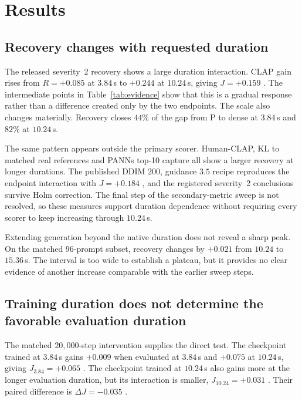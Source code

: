 \section{Results}
\subsection{Recovery changes with requested duration}
The released severity~2 recovery shows a large duration interaction. CLAP gain rises from $R=+0.085$  at $3.84$\,s to $+0.244$  at $10.24$\,s, giving $J=+0.159$ . The intermediate points in Table~\ref{tab:evidence} show that this is a gradual response rather than a difference created only by the two endpoints. The scale also changes materially. Recovery closes $44\%$ of the gap from P to dense at $3.84$\,s and $82\%$ at $10.24$\,s.

The same pattern appears outside the primary scorer. Human-CLAP, KL to matched real references and PANNs top-10 capture all show a larger recovery at longer durations. The published DDIM $200$, guidance $3.5$ recipe reproduces the endpoint interaction with $J=+0.184$ , and the registered severity~2 conclusions survive Holm correction. The final step of the secondary-metric sweep is not resolved, so these measures support duration dependence without requiring every scorer to keep increasing through $10.24$\,s.

Extending generation beyond the native duration does not reveal a sharp peak. On the matched $96$-prompt subset, recovery changes by $+0.021$  from $10.24$ to $15.36$\,s. The interval is too wide to establish a plateau, but it provides no clear evidence of another increase comparable with the earlier sweep steps.

\subsection{Training duration does not determine the favorable evaluation duration}
The matched $20{,}000$-step intervention supplies the direct test. The checkpoint trained at $3.84$\,s gains $+0.009$  when evaluated at $3.84$\,s and $+0.075$  at $10.24$\,s, giving $J_{3.84}=+0.065$ . The checkpoint trained at $10.24$\,s also gains more at the longer evaluation duration, but its interaction is smaller, $J_{10.24}=+0.031$ . Their paired difference is $\Delta J=-0.035$ .

